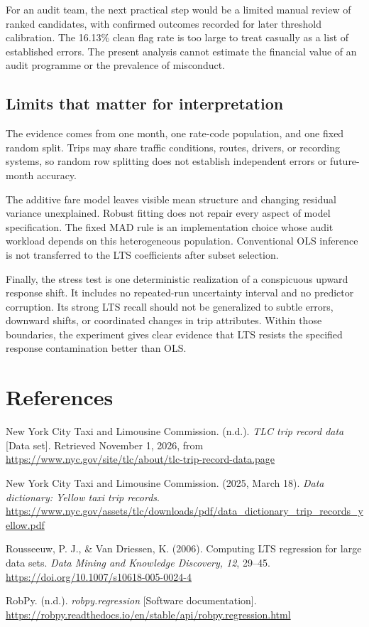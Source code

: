 \documentclass[11pt,letterpaper]{article}
\begin{document}
For an audit team, the next practical step would be a limited manual review of ranked candidates, with confirmed outcomes recorded for later threshold calibration. The 16.13\% clean flag rate is too large to treat casually as a list of established errors. The present analysis cannot estimate the financial value of an audit programme or the prevalence of misconduct.

\subsection{Limits that matter for interpretation}
The evidence comes from one month, one rate-code population, and one fixed random split. Trips may share traffic conditions, routes, drivers, or recording systems, so random row splitting does not establish independent errors or future-month accuracy.

The additive fare model leaves visible mean structure and changing residual variance unexplained. Robust fitting does not repair every aspect of model specification. The fixed MAD rule is an implementation choice whose audit workload depends on this heterogeneous population. Conventional OLS inference is not transferred to the LTS coefficients after subset selection.

Finally, the stress test is one deterministic realization of a conspicuous upward response shift. It includes no repeated-run uncertainty interval and no predictor corruption. Its strong LTS recall should not be generalized to subtle errors, downward shifts, or coordinated changes in trip attributes. Within those boundaries, the experiment gives clear evidence that LTS resists the specified response contamination better than OLS.

\clearpage
\section*{References}
\begingroup
\raggedright
{}
New York City Taxi and Limousine Commission. (n.d.). \emph{TLC trip record data} [Data set]. Retrieved November 1, 2026, from \url{https://www.nyc.gov/site/tlc/about/tlc-trip-record-data.page}

New York City Taxi and Limousine Commission. (2025, March 18). \emph{Data dictionary: Yellow taxi trip records}. \url{https://www.nyc.gov/assets/tlc/downloads/pdf/data_dictionary_trip_records_yellow.pdf}

Rousseeuw, P. J., \& Van Driessen, K. (2006). Computing LTS regression for large data sets. \emph{Data Mining and Knowledge Discovery, 12}, 29--45. \url{https://doi.org/10.1007/s10618-005-0024-4}

RobPy. (n.d.). \emph{robpy.regression} [Software documentation]. \url{https://robpy.readthedocs.io/en/stable/api/robpy.regression.html}
\par\endgroup
\end{document}
